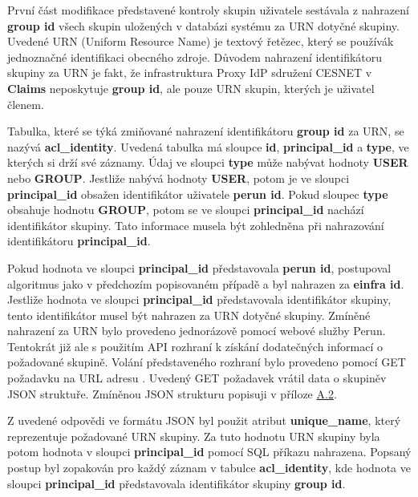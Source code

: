 \documentclass[
  printed, %
  twoside, %
  table,   %
  nolof,     %
  nolot,     %
]{fithesis3}
\begin{document}
\par
První část modifikace představené kontroly skupin uživatele sestávala z nahrazení \textbf{group id} všech skupin uložených v databázi systému  za URN \cite{rfc2141} dotyčné skupiny. Uvedené URN (Uniform Resource Name) je textový řetězec, který se používá\break k jednoznačné identifikaci obecného zdroje. Důvodem nahrazení identifikátoru skupiny za URN je fakt, že infrastruktura Proxy IdP sdružení CESNET v \textbf{Claims} neposkytuje \textbf{group id}, ale pouze URN skupin, kterých je uživatel členem. 

\par 

Tabulka, které se týká zmiňované nahrazení identifikátoru \textbf{group id} za URN, se nazývá \textbf{acl\_identity}. Uvedená tabulka má sloupce \textbf{id}, \textbf{principal\_id} a \textbf{type}, ve kterých si drží své záznamy. Údaj ve sloupci \textbf{type} může nabývat hodnoty \textbf{USER} nebo \textbf{GROUP}. Jestliže nabývá hodnoty \textbf{USER}, potom je ve sloupci \textbf{principal\_id} obsažen identifikátor uživatele \textbf{perun id}. Pokud sloupec \textbf{type} obsahuje hodnotu \textbf{GROUP}, potom se ve sloupci \textbf{principal\_id} nachází identifikátor skupiny. Tato informace musela být zohledněna při nahrazování identifikátoru \textbf{principal\_id}. 

\par 
Pokud hodnota ve sloupci \textbf{principal\_id} představovala \textbf{perun id}, postupoval algoritmus jako v předchozím popisovaném případě a byl nahrazen za \textbf{einfra id}. Jestliže hodnota ve sloupci \textbf{principal\_id} představovala identifikátor skupiny, tento identifikátor musel být nahrazen za URN  dotyčné skupiny. Zmíněné nahrazení za URN bylo provedeno jednorázově pomocí webové služby Perun. Tentokrát již ale s použitím API rozhraní k získání dodatečných informací o požadované skupině. Volání představeného rozhraní bylo provedeno pomocí GET požadavku na URL adresu  . Uvedený GET požadavek vrátil data o skupině\break v JSON struktuře. Zmíněnou JSON strukturu popisuji v příloze \hyperref[table:perunws:group]{A.2}.
\par
Z uvedené odpovědi ve formátu JSON byl použit atribut \linebreak\textbf{unique\_name}, který reprezentuje požadované URN skupiny. Za tuto hodnotu URN skupiny byla potom hodnota v sloupci \textbf{principal\_id} pomocí SQL příkazu nahrazena. Popsaný postup byl zopakován pro každý záznam v tabulce \textbf{acl\_identity}, kde hodnota ve sloupci \textbf{principal\_id} představovala identifikátor skupiny \textbf{group id}. 
\par 
\end{document}
